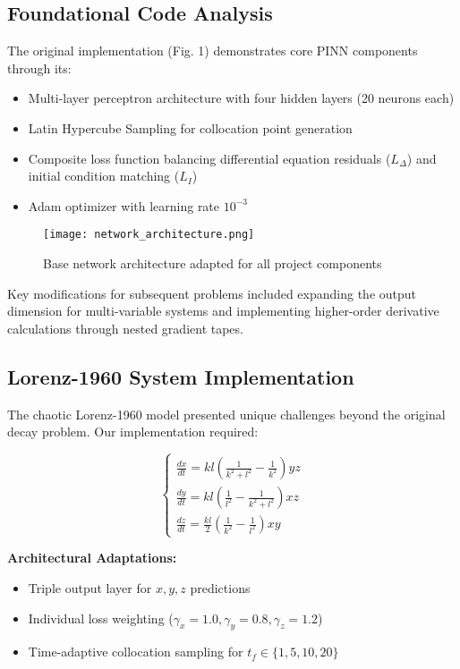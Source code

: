 \documentclass{article}
\begin{document}
\subsection{Foundational Code Analysis}
The original implementation (Fig. 1) demonstrates core PINN components through its:
\begin{itemize}
\item Multi-layer perceptron architecture with four hidden layers (20 neurons each)
\item Latin Hypercube Sampling for collocation point generation
\item Composite loss function balancing differential equation residuals ($L_\Delta$) and initial condition matching ($L_I$)
\item Adam optimizer with learning rate $10^{-3}$
\end{itemize}

\begin{figure}[h]
\centering
\texttt{[image: network\_architecture.png]}
\caption{Base network architecture adapted for all project components}
\end{figure}

Key modifications for subsequent problems included expanding the output dimension for multi-variable systems and implementing higher-order derivative calculations through nested gradient tapes.

\subsection{Lorenz-1960 System Implementation}
The chaotic Lorenz-1960 model presented unique challenges beyond the original decay problem. Our implementation required:

\begin{equation*}
\begin{cases} 
\frac{dx}{dt} = kl\left(\frac{1}{k^2+l^2}-\frac{1}{k^2}\right)yz \\
\frac{dy}{dt} = kl\left(\frac{1}{l^2}-\frac{1}{k^2+l^2}\right)xz \\
\frac{dz}{dt} = \frac{kl}{2}\left(\frac{1}{k^2}-\frac{1}{l^2}\right)xy 
\end{cases}
\end{equation*}

\textbf{Architectural Adaptations:}
\begin{itemize}
\item Triple output layer for $x,y,z$ predictions
\item Individual loss weighting ($\gamma_x=1.0, \gamma_y=0.8, \gamma_z=1.2$)
\item Time-adaptive collocation sampling for $t_f\in\{1,5,10,20\}$
\end{itemize}
\end{document}
